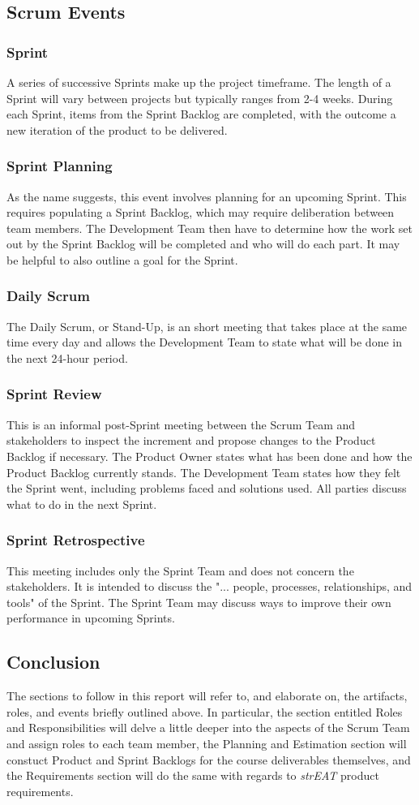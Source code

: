 \subsection{Scrum Events}
\subsubsection{Sprint}
A series of successive Sprints make up the project timeframe. The length of a Sprint will vary between projects but typically ranges from 2-4 weeks. During each Sprint, items from the Sprint Backlog are completed, with the outcome a new iteration of the product to be delivered.
\subsubsection{Sprint Planning}
As the name suggests, this event involves planning for an upcoming Sprint. This requires populating a Sprint Backlog, which may require deliberation between team members. The Development Team then have to determine how the work set out by the Sprint Backlog will be completed and who will do each part. It may be helpful to also outline a goal for the Sprint.
\subsubsection{Daily Scrum}
The Daily Scrum, or Stand-Up, is an short meeting that takes place at the same time every day and allows the Development Team to state what will be done in the next 24-hour period.
\subsubsection{Sprint Review}
This is an informal post-Sprint meeting between the Scrum Team and stakeholders to inspect the increment and propose changes to the Product Backlog if necessary. The Product Owner states what has been done and how the Product Backlog currently stands. The Development Team states how they felt the Sprint went, including problems faced and solutions used. All parties discuss what to do in the next Sprint.
\subsubsection{Sprint Retrospective}
This meeting includes only the Sprint Team and does not concern the stakeholders. It is intended to discuss the "... people, processes, relationships, and tools" of the Sprint. The Sprint Team may discuss ways to improve their own performance in upcoming Sprints.

\subsection{Conclusion}
The sections to follow in this report will refer to, and elaborate on, the artifacts, roles, and events briefly outlined above. In particular, the section entitled Roles and Responsibilities will delve a little deeper into the aspects of the Scrum Team and assign roles to each team member, the Planning and Estimation section will constuct Product and Sprint Backlogs for the course deliverables themselves, and the Requirements section will do the same with regards to \textit{strEAT} product requirements.
